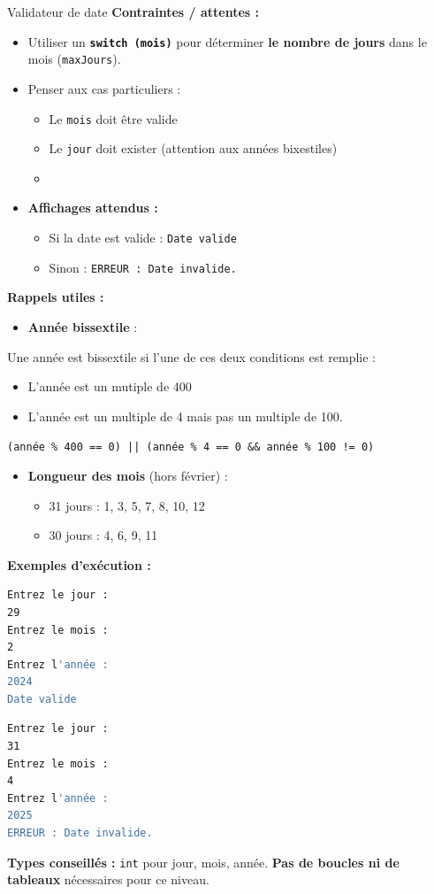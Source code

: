 \begin{UPSTIManipulation}{Validateur de date}
	\textbf{Contraintes / attentes :}
	\begin{itemize}
		\item Utiliser un \textbf{\texttt{switch (mois)}} pour déterminer \textbf{le nombre de jours} dans le mois (\texttt{maxJours}).
		\item Penser aux cas particuliers :
		      \begin{itemize}
			      \item Le \texttt{mois} doit être valide
			      \item Le \texttt{jour} doit exister (attention aux années bixestiles)
			      \item
		      \end{itemize}
		\item \textbf{Affichages attendus :}
		      \begin{itemize}
			      \item Si la date est valide : \texttt{Date valide}
			      \item Sinon : \texttt{ERREUR : Date invalide.}
		      \end{itemize}
	\end{itemize}
	\textbf{Rappels utiles :}
	\begin{itemize}
		\item \textbf{Année bissextile} :
	\end{itemize}
	Une année est bissextile si l'une de ces deux conditions est remplie :
	\begin{itemize}
		\item L'année est un mutiple de 400
		\item L'année est un multiple de 4 mais pas un multiple de 100.
	\end{itemize}
	\texttt{(année \% 400 == 0) || (année \% 4 == 0 \&\& année \% 100 != 0)}
	\begin{itemize}
		\item \textbf{Longueur des mois} (hors février) :
		      \begin{itemize}
			      \item 31 jours : 1, 3, 5, 7, 8, 10, 12
			      \item 30 jours : 4, 6, 9, 11
		      \end{itemize}
	\end{itemize}
	\textbf{Exemples d’exécution :}
	\begin{lstlisting}[language=bash]
Entrez le jour :
29
Entrez le mois :
2
Entrez l'année :
2024
Date valide
\end{lstlisting}
	\begin{lstlisting}[language=bash]
Entrez le jour :
31
Entrez le mois :
4
Entrez l'année :
2025
ERREUR : Date invalide.
\end{lstlisting}
	\textbf{Types conseillés :} \texttt{int} pour jour, mois, année.
	\textbf{Pas de boucles ni de tableaux} nécessaires pour ce niveau.
\end{UPSTIManipulation}

